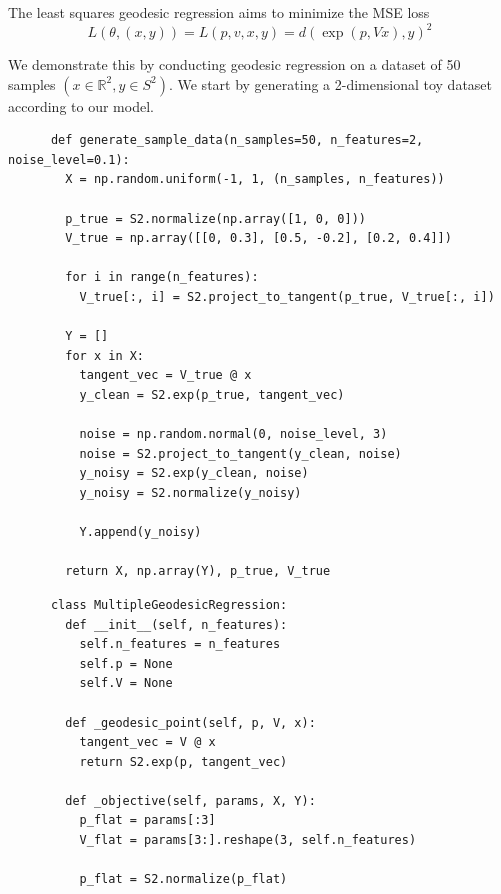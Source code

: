   \begin{definition}
    The least squares geodesic regression aims to minimize the MSE loss 
    \begin{equation}
      L(\theta, (x, y)) = L(p, v, x, y) = d(\exp(p, Vx), y)^2
    \end{equation}
  \end{definition} 

  \begin{example}
    We demonstrate this by conducting geodesic regression on a dataset of 50 samples $(x \in \mathbb{R}^2, y \in S^2)$. We start by generating a 2-dimensional toy dataset according to our model. 

    \begin{lstlisting}
      def generate_sample_data(n_samples=50, n_features=2, noise_level=0.1):
        X = np.random.uniform(-1, 1, (n_samples, n_features))
        
        p_true = S2.normalize(np.array([1, 0, 0]))
        V_true = np.array([[0, 0.3], [0.5, -0.2], [0.2, 0.4]])
        
        for i in range(n_features):
          V_true[:, i] = S2.project_to_tangent(p_true, V_true[:, i])
        
        Y = []
        for x in X:
          tangent_vec = V_true @ x
          y_clean = S2.exp(p_true, tangent_vec)
          
          noise = np.random.normal(0, noise_level, 3)
          noise = S2.project_to_tangent(y_clean, noise)
          y_noisy = S2.exp(y_clean, noise)
          y_noisy = S2.normalize(y_noisy)
          
          Y.append(y_noisy)
        
        return X, np.array(Y), p_true, V_true
    \end{lstlisting}

    \begin{lstlisting}
      class MultipleGeodesicRegression:
        def __init__(self, n_features):
          self.n_features = n_features
          self.p = None
          self.V = None
        
        def _geodesic_point(self, p, V, x):
          tangent_vec = V @ x
          return S2.exp(p, tangent_vec)
        
        def _objective(self, params, X, Y):
          p_flat = params[:3]
          V_flat = params[3:].reshape(3, self.n_features)
          
          p_flat = S2.normalize(p_flat)
          

\end{lstlisting}
\end{example}
